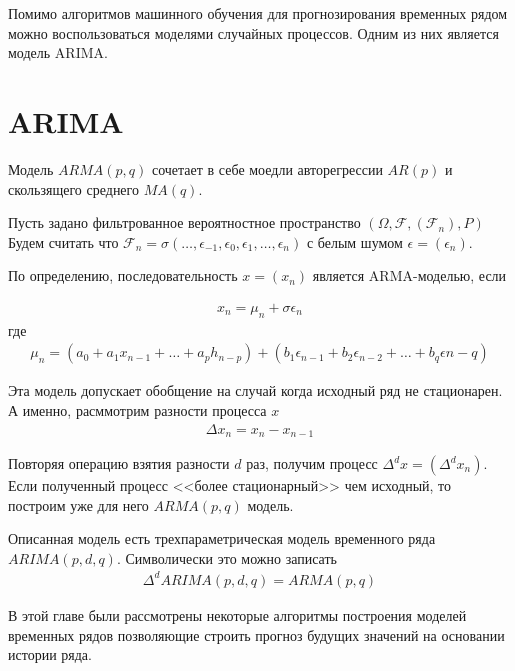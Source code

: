 Помимо алгоритмов машинного обучения для прогнозирования временных рядом можно воспользоваться моделями случайных процессов.
Одним из них является модель ARIMA. 

\section{ARIMA}

Модель $ARMA(p, q)$ сочетает в себе моедли авторегрессии $AR(p)$ и скользящего среднего $MA(q)$.

Пусть задано фильтрованное вероятностное пространство $\left( \Omega, \mathscr{F}, (\mathscr{F}_n), P \right)$
Будем считать что $\mathscr{F}_n = \sigma(\dots, \epsilon_{-1}, \epsilon_0, \epsilon_1, \dots, \epsilon_n)$ с белым шумом $\epsilon = (\epsilon_n)$.

По определению, последовательность $x = (x_n)$ является ARMA-моделью, если 

\begin{align}
	x_n = \mu_n + \sigma \epsilon_n
\end{align}
где
\begin{align}
	\mu_n = \left(a_0 + a_1 x_{n-1} + \dots + a_p h_{n-p} \right) +
	\left(b_1 \epsilon_{n-1} + b_2 \epsilon_{n-2} + \dots + b_q \epsilon{n - q} \right)
\end{align}

Эта модель допускает обобщение на случай когда исходный ряд не стационарен. А именно, расммотрим разности процесса $x$
\begin{align}
	\Delta x_n = x_n - x_{n-1}
\end{align}

Повторяя операцию взятия разности $d$ раз, получим процесс $\Delta^d x = (\Delta^d x_n)$. Если полученный процесс <<более стационарный>>
чем исходный, то построим уже для него $ARMA(p, q)$ модель.

Описанная модель есть трехпараметрическая модель временного ряда $ARIMA(p, d, q)$. Символически это можно записать
\begin{align}
	\Delta^d ARIMA(p, d, q) = ARMA(p, q)
\end{align}

В этой главе были рассмотрены некоторые алгоритмы построения моделей временных рядов позволяющие строить прогноз будущих значений на основании
истории ряда.
